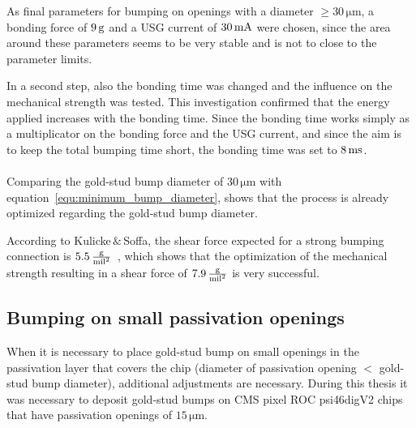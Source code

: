 As final parameters for bumping on openings with a diameter $\ge 30\,\si{\micro \meter}$, a bonding force of $9\,\rm{g}$ and a \ac{USG} current of $30\,\rm{mA}$ were chosen, since the area around these parameters seems to be very stable and is not to close to the parameter limits.

In a second step, also the bonding time was changed and the influence on the mechanical strength was tested. This investigation confirmed that the energy applied increases with the bonding time. Since the bonding time works simply as a multiplicator on the bonding force and the \ac{USG} current, and since the aim is to keep the total bumping time short, the bonding time was set to $8\,\rm{ms}$.
\\
\\Comparing the gold-stud bump diameter of $30\,\si{\micro \meter}$ with equation~\ref{equ:minimum_bump_diameter}, shows that the process is already optimized regarding the gold-stud bump diameter.

According to Kulicke$\,\&\,$Soffa, the shear force expected for a strong bumping connection is $5.5\,\frac{\rm{g}}{\rm{mil}^2}$~\cite{Val13}, which shows that the optimization of the mechanical strength resulting in a shear force of $7.9\,\frac{\rm{g}}{\rm{mil}^2}$ is very successful.

\subsection{Bumping on small passivation openings}\label{sec:small openings}
When it is necessary to place gold-stud bump on small openings in the passivation layer that covers the chip (diameter of passivation opening $<$ gold-stud bump diameter), additional adjustments are necessary. During this thesis it was necessary to deposit gold-stud bumps on \ac{CMS} pixel ROC psi46digV2 chips that have passivation openings of $15\,\si{\micro \meter}$.

